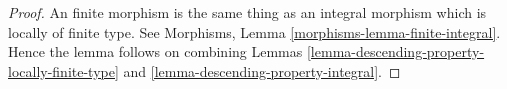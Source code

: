 \documentclass{stacks-project}
\theoremstyle{plain}
\theoremstyle{definition}
\theoremstyle{remark}
\numberwithin{equation}{subsection}
\begin{document}
\begin{proof}
An finite morphism is the same thing as an integral
morphism which is locally of finite type. See
Morphisms, Lemma \ref{morphisms-lemma-finite-integral}.
Hence the lemma follows on combining
Lemmas \ref{lemma-descending-property-locally-finite-type}
and \ref{lemma-descending-property-integral}.
\end{proof}
\end{document}

